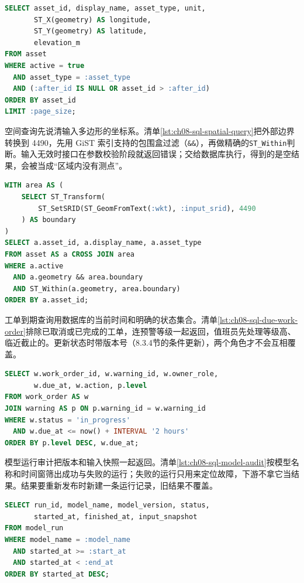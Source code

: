 \begin{lstlisting}[label={lst:ch08-sql-asset-list},language=SQL,caption={按类型和状态读取测点清单}]
SELECT asset_id, display_name, asset_type, unit,
       ST_X(geometry) AS longitude,
       ST_Y(geometry) AS latitude,
       elevation_m
FROM asset
WHERE active = true
  AND asset_type = :asset_type
  AND (:after_id IS NULL OR asset_id > :after_id)
ORDER BY asset_id
LIMIT :page_size;
\end{lstlisting}

空间查询先说清输入多边形的坐标系。清单\ref{lst:ch08-sql-spatial-query}把外部边界转换到 4490，先用 GiST 索引支持的包围盒过滤（\texttt{\&\&}），再做精确的\texttt{ST\_Within}判断。输入无效时接口在参数校验阶段就返回错误；交给数据库执行，得到的是空结果，会被当成“区域内没有测点”。

\begin{lstlisting}[label={lst:ch08-sql-spatial-query},language=SQL,caption={影响区内测点的空间查询}]
WITH area AS (
    SELECT ST_Transform(
        ST_SetSRID(ST_GeomFromText(:wkt), :input_srid), 4490
    ) AS boundary
)
SELECT a.asset_id, a.display_name, a.asset_type
FROM asset AS a CROSS JOIN area
WHERE a.active
  AND a.geometry && area.boundary
  AND ST_Within(a.geometry, area.boundary)
ORDER BY a.asset_id;
\end{lstlisting}

工单到期查询用数据库的当前时间和明确的状态集合。清单\ref{lst:ch08-sql-due-work-order}排除已取消或已完成的工单，连预警等级一起返回，值班员先处理等级高、临近截止的。更新状态时带版本号（8.3.4节的条件更新），两个角色才不会互相覆盖。

\begin{lstlisting}[label={lst:ch08-sql-due-work-order},language=SQL,caption={即将到期工单查询}]
SELECT w.work_order_id, w.warning_id, w.owner_role,
       w.due_at, w.action, p.level
FROM work_order AS w
JOIN warning AS p ON p.warning_id = w.warning_id
WHERE w.status = 'in_progress'
  AND w.due_at <= now() + INTERVAL '2 hours'
ORDER BY p.level DESC, w.due_at;
\end{lstlisting}

模型运行审计把版本和输入快照一起返回。清单\ref{lst:ch08-sql-model-audit}按模型名称和时间窗筛出成功与失败的运行；失败的运行只用来定位故障，下游不拿它当结果。结果要重新发布时新建一条运行记录，旧结果不覆盖。

\begin{lstlisting}[label={lst:ch08-sql-model-audit},language=SQL,caption={模型运行审计查询}]
SELECT run_id, model_name, model_version, status,
       started_at, finished_at, input_snapshot
FROM model_run
WHERE model_name = :model_name
  AND started_at >= :start_at
  AND started_at < :end_at
ORDER BY started_at DESC;
\end{lstlisting}

